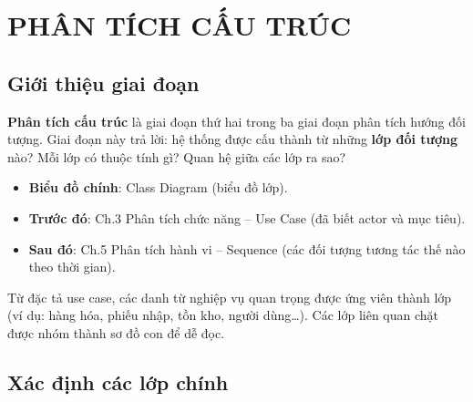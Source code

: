 \chapter{PHÂN TÍCH CẤU TRÚC}

\section{Giới thiệu giai đoạn}

\textbf{Phân tích cấu trúc} là giai đoạn thứ hai trong ba giai đoạn phân tích hướng đối tượng. Giai đoạn này trả lời: hệ thống được cấu thành từ những \textbf{lớp đối tượng} nào? Mỗi lớp có thuộc tính gì? Quan hệ giữa các lớp ra sao?

\begin{itemize}[leftmargin=1.5cm]
    \item \textbf{Biểu đồ chính}: Class Diagram (biểu đồ lớp).
    \item \textbf{Trước đó}: Ch.3 Phân tích chức năng -- Use Case (đã biết actor và mục tiêu).
    \item \textbf{Sau đó}: Ch.5 Phân tích hành vi -- Sequence (các đối tượng tương tác thế nào theo thời gian).
\end{itemize}

Từ đặc tả use case, các danh từ nghiệp vụ quan trọng được ứng viên thành lớp (ví dụ: hàng hóa, phiếu nhập, tồn kho, người dùng\ldots). Các lớp liên quan chặt được nhóm thành sơ đồ con để dễ đọc.

\section{Xác định các lớp chính}

